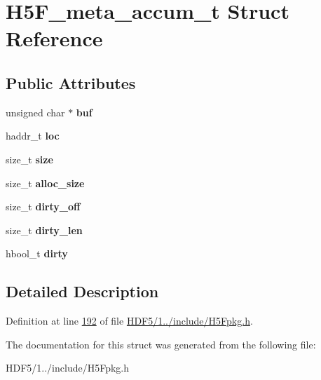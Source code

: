 \hypertarget{struct_h5_f__meta__accum__t}{}\section{H5\+F\+\_\+meta\+\_\+accum\+\_\+t Struct Reference}
\label{struct_h5_f__meta__accum__t}
\subsection*{Public Attributes}
\begin{DoxyCompactItemize}
\item 
\mbox{\label{struct_h5_f__meta__accum__t_aba4562ae28c2427d0cb83dcda11e18f4}} 
unsigned char $\ast$ {\bfseries buf}
\item 
\mbox{\label{struct_h5_f__meta__accum__t_a7235a21c7fde4c4bc53b71c37d81ae98}} 
haddr\+\_\+t {\bfseries loc}
\item 
\mbox{\label{struct_h5_f__meta__accum__t_a0eb661b4a0e9ea9123711cb3e1245dac}} 
size\+\_\+t {\bfseries size}
\item 
\mbox{\label{struct_h5_f__meta__accum__t_a911ed3c2dd7003dc882aad782b812d53}} 
size\+\_\+t {\bfseries alloc\+\_\+size}
\item 
\mbox{\label{struct_h5_f__meta__accum__t_ab91b49d1ca31aa12d87d5983ca3e8782}} 
size\+\_\+t {\bfseries dirty\+\_\+off}
\item 
\mbox{\label{struct_h5_f__meta__accum__t_a2e17e597b56be0b3db1fe92cced8c069}} 
size\+\_\+t {\bfseries dirty\+\_\+len}
\item 
\mbox{\label{struct_h5_f__meta__accum__t_ad73ff7ce3c9db20506cb1f611dd65793}} 
hbool\+\_\+t {\bfseries dirty}
\end{DoxyCompactItemize}


\subsection{Detailed Description}


Definition at line \hyperlink{_h_d_f5_21_810_81_2include_2_h5_fpkg_8h_source_l00192}{192} of file \hyperlink{_h_d_f5_21_810_81_2include_2_h5_fpkg_8h_source}{H\+D\+F5/1../include/\+H5\+Fpkg.\+h}.



The documentation for this struct was generated from the following file\+:\begin{DoxyCompactItemize}
\item 
H\+D\+F5/1../include/\+H5\+Fpkg.\+h\end{DoxyCompactItemize}
